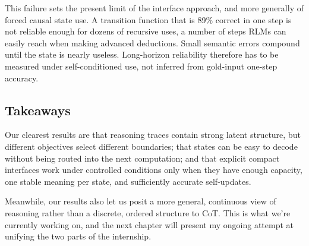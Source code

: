 This failure sets the present limit of the interface approach, and more generally of forced causal state use. A transition function that is 89\% correct in one step is not reliable enough for dozens of recursive uses, a number of steps RLMs can easily reach when making advanced deductions. Small semantic errors compound until the state is nearly useless. Long-horizon reliability therefore has to be measured under self-conditioned use, not inferred from gold-input one-step accuracy.

\FloatBarrier
\subsection{Takeaways}

Our clearest results are that reasoning traces contain strong latent structure, but different objectives select different boundaries; that states can be easy to decode without being routed into the next computation; and that explicit compact interfaces work under controlled conditions only when they have enough capacity, one stable meaning per state, and sufficiently accurate self-updates.

Meanwhile, our results also let us posit a more general, continuous view of reasoning rather than a discrete, ordered structure to CoT. This is what we're currently working on, and the next chapter will present my ongoing attempt at unifying the two parts of the internship.
